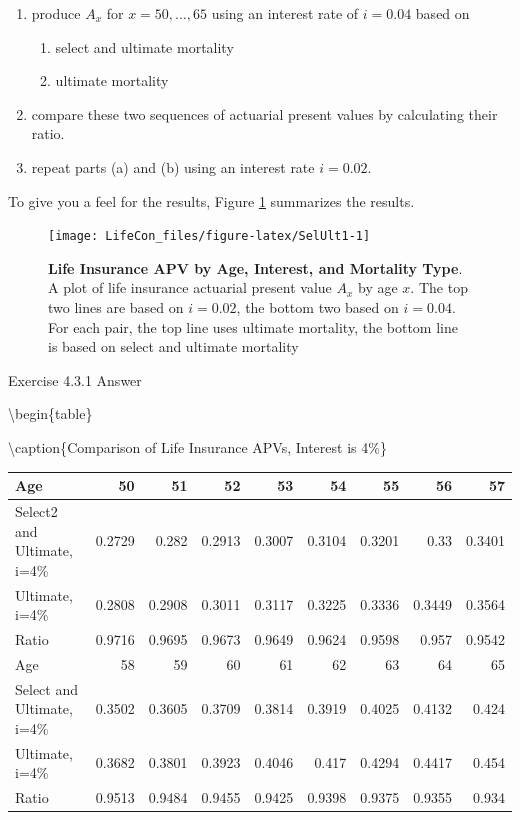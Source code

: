 \documentclass[
]{book}
\providecommand{\tightlist}{%
  \setlength{\itemsep}{0pt}\setlength{\parskip}{0pt}}
\begin{document}
\begin{enumerate}
\def\labelenumi{\alph{enumi}.}
\tightlist
\item
  produce \(A_x\) for \(x=50, \ldots, 65\) using an interest rate of \(i=0.04\) based on

  \begin{enumerate}
  \def\labelenumii{\roman{enumii}.}
  \tightlist
  \item
    select and ultimate mortality
  \item
    ultimate mortality
  \end{enumerate}
\item
  compare these two sequences of actuarial present values by calculating their ratio.
\item
  repeat parts (a) and (b) using an interest rate \(i=0.02\).
\end{enumerate}

To give you a feel for the results, Figure \ref{fig:SelUlt1} summarizes the results.



\begin{figure}

{\centering \texttt{[image: LifeCon\_files/figure-latex/SelUlt1-1]} 

}

\caption{\textbf{Life Insurance APV by Age, Interest, and Mortality Type}. A plot of life insurance actuarial present value \(A_x\) by age \(x\). The top two lines are based on \(i=0.02\), the bottom two based on \(i=0.04\). For each pair, the top line uses ultimate mortality, the bottom line is based on select and ultimate mortality}\label{fig:SelUlt1}
\end{figure}

Exercise 4.3.1 Answer

\leavevmode\hypertarget{toggleTheory.Exer4.3.1}{}%
\textbackslash begin\{table\}

\textbackslash caption\{\label{tab:unnamed-chunk-5}Comparison of Life Insurance APVs, Interest is 4\%\}
\centering

\begin{tabular}[t]{l|r|r|r|r|r|r|r|r}
\hline
Age & 50 & 51 & 52 & 53 & 54 & 55 & 56 & 57\\
\hline
Select2 and Ultimate, i=4\% & 0.2729 & 0.282 & 0.2913 & 0.3007 & 0.3104 & 0.3201 & 0.33 & 0.3401\\
\hline
Ultimate, i=4\% & 0.2808 & 0.2908 & 0.3011 & 0.3117 & 0.3225 & 0.3336 & 0.3449 & 0.3564\\
\hline
Ratio & 0.9716 & 0.9695 & 0.9673 & 0.9649 & 0.9624 & 0.9598 & 0.957 & 0.9542\\
\hline
Age & 58 & 59 & 60 & 61 & 62 & 63 & 64 & 65\\
\hline
Select and Ultimate, i=4\% & 0.3502 & 0.3605 & 0.3709 & 0.3814 & 0.3919 & 0.4025 & 0.4132 & 0.424\\
\hline
Ultimate, i=4\% & 0.3682 & 0.3801 & 0.3923 & 0.4046 & 0.417 & 0.4294 & 0.4417 & 0.454\\
\hline
Ratio & 0.9513 & 0.9484 & 0.9455 & 0.9425 & 0.9398 & 0.9375 & 0.9355 & 0.934\\
\hline
\end{tabular}
\end{document}
